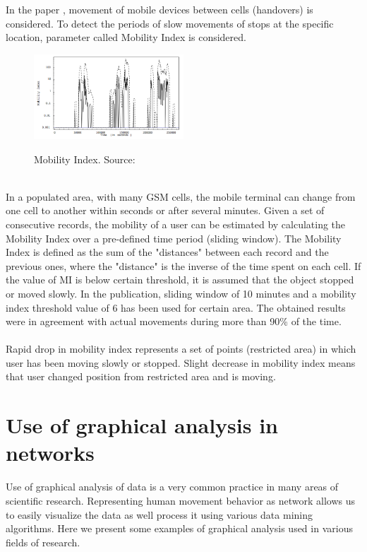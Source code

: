 In the paper \cite{MobilityIndexGIS}, movement of mobile devices between cells (handovers) is considered. To detect the periods of slow movements of stops at the specific location, parameter called Mobility Index is considered. 
\begin{figure}[!ht]
	\centering
	\includegraphics[width=0.5\textwidth]{images/intro_mobility_index.png}\\
	\caption{Mobility Index. Source: \cite{MobilityIndexGIS}}
	\label{fig:introduction_mob_index}
\end{figure}
\\
In a populated area, with many GSM cells, the mobile
terminal can change from one cell to another within
seconds or after several minutes. Given a set of consecutive records, the mobility of a user can be estimated by calculating the Mobility Index over a pre-defined time period (sliding window). The Mobility Index is defined as the sum of the "distances" between each record and the previous ones, where the "distance" is the inverse of the time spent on each cell. If the value of MI is below certain threshold, it is assumed that the object stopped or moved slowly. In the publication, sliding window of 10 minutes and a mobility index threshold value of 6 has been used for certain area. The obtained results were in agreement with actual movements during more than 90\% of the time. 
\\\\
Rapid drop in mobility index represents a set of points (restricted area) in which user has been moving slowly or stopped. Slight decrease in mobility index means that user changed position from restricted area and is moving.
\section{Use of graphical analysis in networks}
Use of graphical analysis of data is a very common practice in many areas of scientific research. Representing human movement behavior as network allows us to easily visualize the data as well process it using various data mining algorithms. Here we present some examples of graphical analysis used in various fields of research. 
